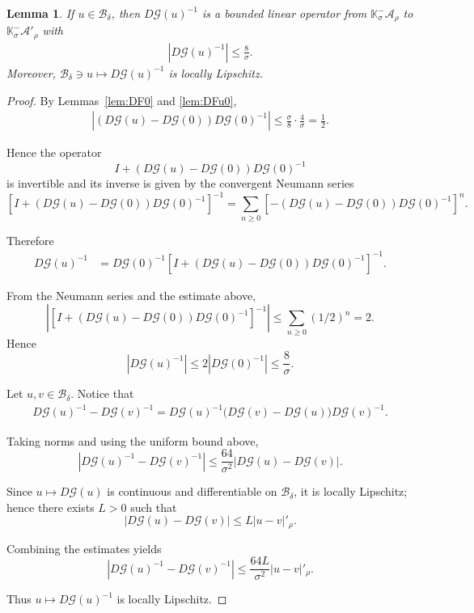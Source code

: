 \documentclass[12pt,reqno,a4paper]{amsart}%
\numberwithin{equation}{section}
\newtheorem{lemma}[theorem]{Lemma}
\newcommand{\Bs}{{\mathscr{B}}}
\newcommand{\A}{{\mathcal A}}
\newcommand{\GG}{{\mathcal G}}
\newcommand{\Kk}{{\mathbb{K}}}
\begin{document}
\begin{lemma}\label{lem:DFu}
If $u\in\Bs_{\delta}$, then $D\GG(u)^{-1}$ is a bounded linear operator from $\Kk_\sigma^-\A_{\rho}$ to $\Kk_\sigma^-\A'_{\rho}$ with
\begin{align*}
|D\GG(u)^{-1}|\leq \frac{8}{\sigma}.
\end{align*}
Moreover,  $\Bs_{\delta} \ni u\mapsto D\GG(u)^{-1}$ is locally Lipschitz.
\end{lemma}

\begin{proof}
By Lemmas~\ref{lem:DF0} and \ref{lem:DFu0},
\begin{align*}
| (D\GG(u)-D\GG(0))D\GG(0)^{-1} |
\leq \frac{\sigma}{8}\cdot\frac{4}{\sigma}= \frac12.
\end{align*}

Hence the operator
\[
I+(D\GG(u)-D\GG(0))D\GG(0)^{-1}
\]
is invertible and its inverse is given by the convergent Neumann series
\[
\left[I+(D\GG(u)-D\GG(0))D\GG(0)^{-1}\right]^{-1}
=
\sum_{n\ge 0} \left[-(D\GG(u)-D\GG(0))D\GG(0)^{-1}\right]^n.
\]

Therefore
\begin{align*}
D\GG(u)^{-1}
&= D\GG(0)^{-1}
\left[I+(D\GG(u)-D\GG(0))D\GG(0)^{-1}\right]^{-1}.
\end{align*}


From the Neumann series and the estimate above,
\[
\left|
\left[I+(D\GG(u)-D\GG(0))D\GG(0)^{-1}\right]^{-1}
\right|
\leq \sum_{n\ge 0} (1/2)^n = 2.
\]
Hence
\[
|D\GG(u)^{-1}|
\leq 2|D\GG(0)^{-1}|
\leq \frac{8}{\sigma}.
\]

%
Let \(u,v \in \Bs_\delta\). 
Notice that
\begin{align*}
D\GG(u)^{-1}-D\GG(v)^{-1}
=
D\GG(u)^{-1}\bigl(D\GG(v)-D\GG(u)\bigr)D\GG(v)^{-1}.
\end{align*}

Taking norms and using the uniform bound above,
\[
|D\GG(u)^{-1}-D\GG(v)^{-1}|
\le
\frac{64}{\sigma^2}
|D\GG(u)-D\GG(v)|.
\]

Since \(u \mapsto D\GG(u)\) is continuous and differentiable on \(\Bs_\delta\),
it is locally Lipschitz; hence there exists \(L>0\) such that
\[
|D\GG(u)-D\GG(v)|\le L|u-v|'_\rho.
\]

Combining the estimates yields
\[
|D\GG(u)^{-1}-D\GG(v)^{-1}|
\le \frac{64L}{\sigma^2}|u-v|'_\rho.
\]

Thus \(u \mapsto D\GG(u)^{-1}\) is locally Lipschitz.

\end{proof}
\end{document}

